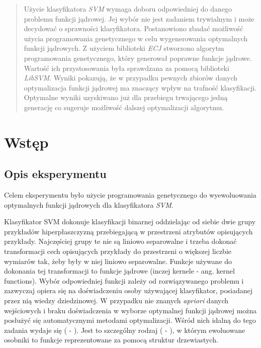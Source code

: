 \documentclass{article}
\begin{document}



\begin{abstract}
Użycie klasyfikatora \emph{SVM} wymaga doboru odpowiedniej do danego problemu funkcji jądrowej. Jej wybór nie jest zadaniem trywialnym i może decydować o sprawności klasyfikatora. Postanowiono zbadać możliwość użycia programowania genetycznego w celu wygenerowania optymalnych funkcji jądrowych. Z użyciem biblioteki \emph{ECJ} stworzono algorytm programowania genetycznego, który generował poprawne funkcje jądrowe. Wartość ich przystosowania była sprawdzana za pomocą biblioteki \emph{LibSVM}.
Wyniki pokazują, że w przypadku pewnych zbiorów danych optymalizacja funkcji jądrowej ma znaczący wpływ na trafność klasyfikacji. Optymalne wyniki uzyskiwano już dla przebiegu trwającego jedną generację co sugeruje możliwość dalszej optymalizacji algorytmu.
\end{abstract}


\section{Wstęp}
	\subsection{Opis eksperymentu}
	Celem eksperymentu było użycie programowania genetycznego do wyewoluowania optymalnych funkcji jądrowych dla klasyfikatora \emph{SVM}.

	Klasyfikator SVM dokonuje klasyfikacji binarnej oddzielając od siebie dwie grupy przykładów hiperpłaszczyzną przebiegającą w przestrzeni atrybutów opisujących przykłady. Najczęściej grupy te nie są liniowo separowalne i trzeba dokonać transformacji cech opisujących przykłady do przestrzeni o większej liczbie wymiarów tak, żeby były w niej liniowo separowalne. Funkcje używane do dokonania tej transformacji to funkcje jądrowe  (inczej kernele  - ang. kernel functions). Wybór odpowiedniej funkcji zależy od rozwiązywanego problemu i zazwyczaj opiera się na doświadczeniu osoby używającej klasyfikator, posiadanej przez nią wiedzy dziedzinowej. W przypadku nie znanych \textit{apriori} danych wejściowych i braku doświadczenia w wyborze optymalnej funkcji jądrowej można posłużyć się automatycznymi metodami optymalizacji. Wśród nich idalną do tego zadania wydaje się  ( - ). Jest to szczególny rodzaj  ( - ), w którym ewoluowane osobniki to funkcje reprezentowane za pomocą struktur drzewiastych.
	
\end{document}
